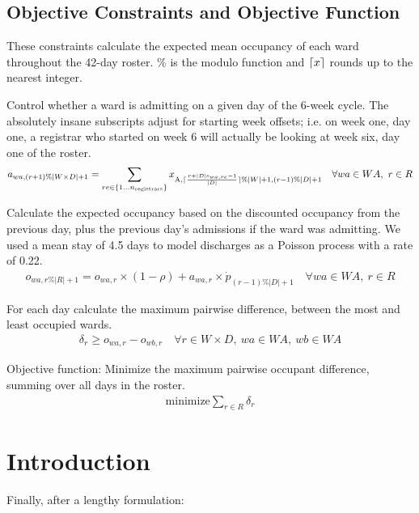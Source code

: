 \documentclass[a4paper]{article}
\DeclarePairedDelimiter{\ceil}{\lceil}{\rceil}
\begin{document}
\subsection{Objective Constraints and Objective Function}

These constraints calculate the expected mean occupancy of each ward throughout the 42-day roster. $\%$ is the modulo function and $\ceil{x}$ rounds up to the nearest integer.

Control whether a ward is admitting on a given day of the 6-week cycle. The absolutely insane subscripts adjust for starting week offsets; i.e. on week one, day one, a registrar who started on week 6 will actually be looking at week six, day one of the roster.
\begin{align}
  a_{wa, (r+1)\%|W\times D|+1} = \sum_{re\in \{1\dots n_\text{registrars}\}}{x_{\text{A}, \ceil{\frac{r+|D|\text{s}_{wa, re}-1}{|D|}} \% |W|+1, (r-1) \% |D|+1}} \quad\forall wa \in WA,\ r \in R
\end{align}

Calculate the expected occupancy based on the discounted occupancy from the previous day, plus the previous day's admissions if the ward was admitting. We used a mean stay of 4.5 days to model discharges as a Poisson process with a rate of 0.22.
\begin{align}
  o_{wa, r\%|R|+1} = o_{wa, r} \times (1-\rho) + a_{wa, r} \times \dot{p}_{(r-1)\%|D|+1} \quad\forall wa \in WA,\ r \in R
\end{align}

For each day calculate the maximum pairwise difference, between the most and least occupied wards.
\begin{align}
  \delta_r \ge o_{wa, r} - o_{wb, r} \quad\forall r \in W\times D,\ wa \in WA,\ wb \in WA
\end{align}

\begin{framed}
Objective function: Minimize the maximum pairwise occupant difference, summing over all days in the roster.
\begin{align}
  \text{minimize} \sum_{r\in R}{\delta_r}
\end{align}
\end{framed}

\newpage
\section{Introduction}

Finally, after a lengthy formulation:
\end{document}
